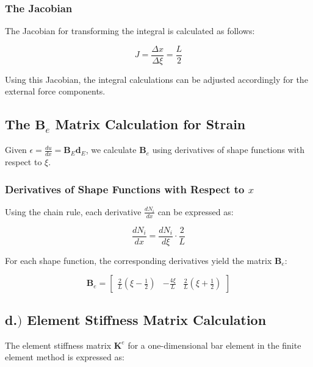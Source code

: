 \subsubsection*{The Jacobian}

The Jacobian for transforming the integral is calculated as follows:

\begin{equation*}
    J = \frac{\Delta x}{\Delta \xi} = \frac{L}{2}
\end{equation*}

Using this Jacobian, the integral calculations can be adjusted accordingly for the external force components.

\subsection*{The \( \mathbf{B}_e \) Matrix Calculation for Strain}

Given \( \epsilon = \frac{du}{dx} = \mathbf{B}_E \mathbf{d}_E \), we calculate \( \mathbf{B}_e \) using derivatives of shape functions with respect to \( \xi \).

\subsubsection*{Derivatives of Shape Functions with Respect to \( x \)}

Using the chain rule, each derivative \( \frac{dN_i}{dx} \) can be expressed as:

\[
\frac{dN_i}{dx} = \frac{dN_i}{d\xi} \cdot \frac{2}{L}
\]

For each shape function, the corresponding derivatives yield the matrix \( \mathbf{B}_e \):

\begin{equation}
    \mathbf{B}_e = \begin{bmatrix} \frac{2}{L} \left( \xi - \frac{1}{2} \right) & -\frac{4\xi}{L} & \frac{2}{L} \left( \xi + \frac{1}{2} \right) \end{bmatrix}
\end{equation}

\subsection*{d.$)$ Element Stiffness Matrix Calculation}

The element stiffness matrix \( \mathbf{K}^e \) for a one-dimensional bar element in the finite element method is expressed as:

